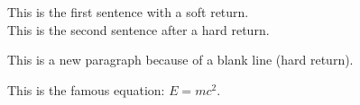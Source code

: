 \documentclass[14pt]{article}
\begin{document}
This is the first sentence with a soft return.\\
This is the second sentence after a hard return.

This is a new paragraph because of a blank line (hard return).

This is the famous equation: $E = mc^2$.
\end{document}
